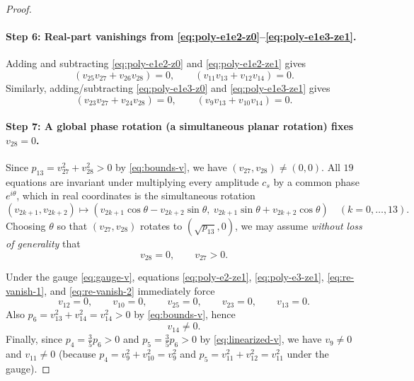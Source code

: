 \documentclass[11pt]{article}
\begin{document}
\begin{proof}
\paragraph{Step 6: Real-part vanishings from \eqref{eq:poly-e1e2-z0}--\eqref{eq:poly-e1e3-ze1}.}
Adding and subtracting \eqref{eq:poly-e1e2-z0} and \eqref{eq:poly-e1e2-ze1} gives
\begin{equation}
\label{eq:re-vanish-1}
(v_{25}v_{27}+v_{26}v_{28})=0,\qquad (v_{11}v_{13}+v_{12}v_{14})=0.
\end{equation}
Similarly, adding/subtracting \eqref{eq:poly-e1e3-z0} and \eqref{eq:poly-e1e3-ze1} gives
\begin{equation}
\label{eq:re-vanish-2}
(v_{23}v_{27}+v_{24}v_{28})=0,\qquad (v_{9}v_{13}+v_{10}v_{14})=0.
\end{equation}

\paragraph{Step 7: A global phase rotation (a simultaneous planar rotation) fixes $v_{28}=0$.}
Since $p_{13}=v_{27}^2+v_{28}^2>0$ by \eqref{eq:bounds-v}, we have $(v_{27},v_{28})\neq (0,0)$.
All $19$ equations are invariant under multiplying every amplitude $c_s$ by a common phase $e^{i\theta}$,
which in real coordinates is the simultaneous rotation
\[
(v_{2k+1},v_{2k+2})\mapsto (v_{2k+1}\cos\theta-v_{2k+2}\sin\theta,\ v_{2k+1}\sin\theta+v_{2k+2}\cos\theta)
\quad(k=0,\dots,13).
\]
Choosing $\theta$ so that $(v_{27},v_{28})$ rotates to $(\sqrt{p_{13}},0)$, we may assume \emph{without loss of generality} that
\begin{equation}
\label{eq:gauge-v}
v_{28}=0,\qquad v_{27}>0.
\end{equation}

Under the gauge \eqref{eq:gauge-v}, equations \eqref{eq:poly-e2-ze1}, \eqref{eq:poly-e3-ze1},
\eqref{eq:re-vanish-1}, and \eqref{eq:re-vanish-2} immediately force
\[
v_{12}=0,\qquad v_{10}=0,\qquad v_{25}=0,\qquad v_{23}=0,\qquad v_{13}=0.
\]
Also $p_6=v_{13}^2+v_{14}^2=v_{14}^2>0$ by \eqref{eq:bounds-v}, hence
\begin{equation}
\label{eq:v14-nonzero}
v_{14}\neq 0.
\end{equation}
Finally, since $p_4=\frac35 p_6>0$ and $p_5=\frac35 p_6>0$ by \eqref{eq:linearized-v},
we have $v_9\neq 0$ and $v_{11}\neq 0$ (because $p_4=v_9^2+v_{10}^2=v_9^2$ and $p_5=v_{11}^2+v_{12}^2=v_{11}^2$ under the gauge).


\end{proof}
\end{document}
